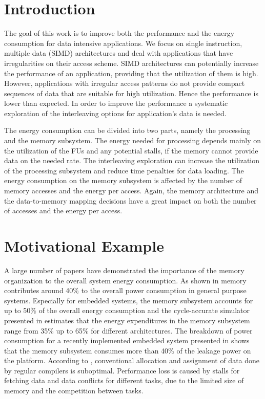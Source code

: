 \documentclass[prodmode,acmtodaes]{acmsmall}
\begin{document}
\maketitle

\section{Introduction}

The goal of this work is to improve both the performance and the energy consumption for data intensive applications. 
We focus on single instruction, multiple data (SIMD) architectures and deal with applications that have irregularities on their access scheme. 
SIMD architectures can potentially increase the performance of an application, providing that the utilization of them is high. 
However, applications with irregular access patterns do not provide compact sequences of data that are suitable for high utilization. 
Hence the performance is lower than expected. 
In order to improve the performance a systematic exploration of the interleaving options for application's data is needed. 

The energy consumption can be divided into two parts, namely the processing and the memory subsystem. 
The energy needed for processing depends mainly on the utilization of the FUs and any potential stalls, if the memory cannot provide data on the needed rate.
The interleaving exploration can increase the utilization of the processing subsystem and reduce time penalties for data loading.   
The energy consumption on the memory subsystem is affected by the number of memory accesses and the energy per access. 
Again, the memory architecture and the data-to-memory mapping decisions have a great impact on both the number of accesses and the energy per access.

\section{Motivational Example}

A large number of papers have demonstrated the importance of the memory organization to the overall system energy consumption. 
As shown in \cite{Gonzalez1996} memory contributes around 40\% to the overall power consumption in general purpose systems. 
Especially for embedded systems, the memory subsystem accounts for up to 50\% of the overall energy consumption \cite{Che09} and the cycle-accurate simulator presented in \cite{Ben99} estimates that the energy expenditures in the memory subsystem range from 35\% up to 65\% for different architectures. 
The breakdown of power consumption for a recently implemented embedded system presented in \cite{Hul11} shows that the memory subsystem consumes more than 40\% of the leakage power on the platform. 
According to \cite{tcm}, conventional allocation and assignment of data done by regular compilers is suboptimal. 
Performance loss is caused by stalls for fetching data and data conflicts for different tasks, due to the limited size of memory and the competition between tasks. 
\end{document}

